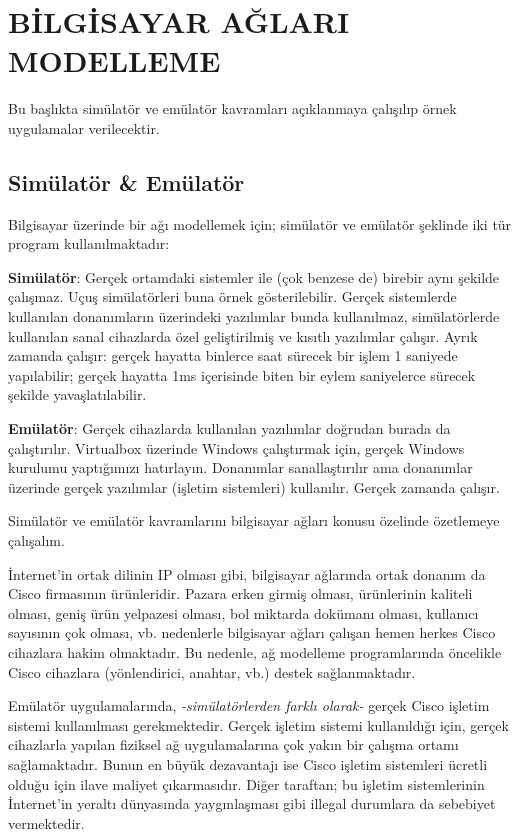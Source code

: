 \section{BİLGİSAYAR AĞLARI MODELLEME}
Bu başlıkta simülatör ve emülatör kavramları açıklanmaya çalışılıp örnek uygulamalar verilecektir.

\subsection{Simülatör \& Emülatör}

Bilgisayar üzerinde bir ağı modellemek için; simülatör ve emülatör şeklinde iki tür program kullanılmaktadır:

\textbf{Simülatör}: Gerçek ortamdaki sistemler ile (çok benzese de) birebir aynı şekilde çalışmaz. Uçuş simülatörleri buna örnek gösterilebilir. Gerçek sistemlerde kullanılan donanımların üzerindeki yazılımlar bunda kullanılmaz, simülatörlerde kullanılan sanal cihazlarda özel geliştirilmiş ve kısıtlı yazılımlar çalışır. Ayrık zamanda çalışır: gerçek hayatta binlerce saat sürecek bir işlem 1 saniyede yapılabilir;  gerçek hayatta 1ms içerisinde biten bir eylem saniyelerce sürecek şekilde yavaşlatılabilir.

\vskip 0.5cm
\textbf{Emülatör}: Gerçek cihazlarda kullanılan yazılımlar doğrudan burada da çalıştırılır. Virtualbox üzerinde Windows çalıştırmak için, gerçek Windows kurulumu yaptığımızı hatırlayın. Donanımlar sanallaştırılır ama donanımlar üzerinde gerçek yazılımlar (işletim sistemleri) kullanılır. Gerçek zamanda çalışır.

\vskip 0.5cm
Simülatör ve emülatör kavramlarını bilgisayar ağları konusu özelinde özetlemeye çalışalım.
\vskip 0.5cm

İnternet'in ortak dilinin IP olması gibi, bilgisayar ağlarında ortak donanım da Cisco firmasının ürünleridir. Pazara erken girmiş olması, ürünlerinin kaliteli olması, geniş ürün yelpazesi olması, bol miktarda dokümanı olması, kullanıcı sayısının çok olması, vb. nedenlerle bilgisayar ağları çalışan hemen herkes Cisco cihazlara hakim olmaktadır. Bu nedenle, ağ modelleme programlarında öncelikle Cisco cihazlara (yönlendirici, anahtar, vb.) destek sağlanmaktadır.

Emülatör uygulamalarında, \textit{-simülatörlerden farklı olarak-} gerçek Cisco işletim sistemi kullanılması gerekmektedir. Gerçek işletim sistemi kullanıldığı için, gerçek cihazlarla yapılan fiziksel ağ uygulamalarına çok yakın bir çalışma ortamı sağlamaktadır. Bunun en büyük dezavantajı ise Cisco işletim sistemleri ücretli olduğu için ilave maliyet çıkarmasıdır. Diğer taraftan; bu işletim sistemlerinin İnternet'in yeraltı dünyasında yaygınlaşması gibi illegal durumlara da sebebiyet vermektedir.

